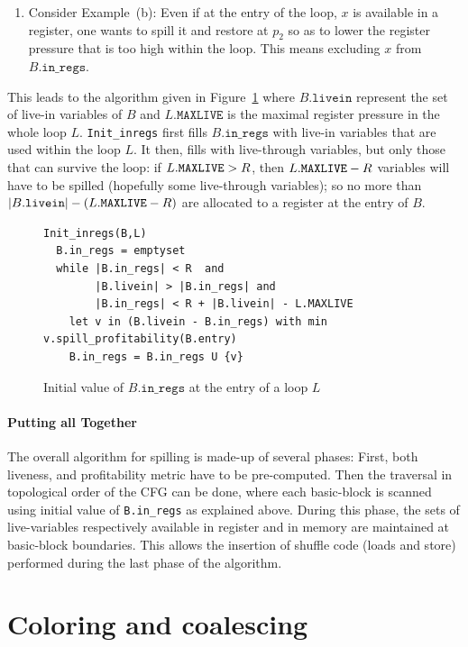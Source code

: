 {\begin{enumerate}
  Not doing so would involve a reload at every iteration of the loop at $p_2$. 
\item Consider Example~(b): 
  Even if at the entry of the loop, $x$ is available in a register, one wants to spill it and restore at $p_2$ so as to lower the register pressure that is too high within the loop.
  This means excluding $x$ from $B.\texttt{in\_regs}$.
\end{enumerate}
This leads to the algorithm given in Figure~\ref{fig:ra:initloop} where $B.\texttt{livein}$ represent the set of live-in variables of $B$ and $L.\texttt{MAXLIVE}$ is the maximal register pressure in the whole loop $L$.
\texttt{Init\_inregs} first fills $B.\texttt{in\_regs}$ with live-in variables that are used within the loop $L$.
It then, fills with live-through variables, but only those that can survive the loop:
if $L.\texttt{MAXLIVE}>R$, then  $L.\texttt{MAXLIVE}-R$ variables will have to be spilled (hopefully some live-through variables);
so no more than $|B.\texttt{livein}|-(L.\texttt{MAXLIVE}-R)$ are allocated to a register at the entry of $B$.

\begin{figure}
\begin{verbatim}
Init_inregs(B,L)
  B.in_regs = emptyset
  while |B.in_regs| < R  and
        |B.livein| > |B.in_regs| and
        |B.in_regs| < R + |B.livein| - L.MAXLIVE
    let v in (B.livein - B.in_regs) with min v.spill_profitability(B.entry)
    B.in_regs = B.in_regs U {v}
\end{verbatim}
\caption{\label{fig:ra:initloop}Initial value of $B.\texttt{in\_regs}$ at the entry of a loop $L$}
\end{figure}

\paragraph{Putting all Together}
The overall algorithm for spilling is made-up of several phases:
First, both liveness, and profitability metric have to be pre-computed.
Then the traversal in topological order of the CFG can be done, where each basic-block is scanned using initial value of \verb+B.in_regs+ as explained above.
During this phase, the sets of live-variables respectively available in register and in memory are maintained at basic-block boundaries.
This allows the insertion of shuffle code (loads and store) performed during the last phase of the algorithm.

\section{Coloring and coalescing}

}
